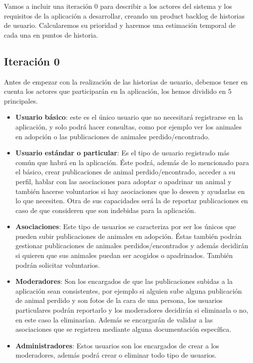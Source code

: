 Vamos a incluir una iteración 0 para describir a los actores del sistema y los requisitos de la aplicación a desarrollar, creando un product backlog de historias de usuario. Calcularemos  su prioridad y haremos una estimación temporal de cada una en puntos de historia.  

\subsection{Iteración 0}
Antes de empezar con la realización de las historias de usuario, debemos tener en cuenta los actores que participarán en la aplicación, los hemos dividido en 5 principales.
\begin{itemize}
	\item \textbf{Usuario básico}: este es el único usuario que no necesitará registrarse en la aplicación, y solo podrá hacer consultas, como por ejemplo ver los animales en adopción o las publicaciones de animales perdido/encontrado.
	\item \textbf{Usuario estándar o particular}: Es el tipo de usuario registrado más común que habrá en la aplicación. Éste podrá, además de lo mencionado para el básico, crear publicaciones de animal perdido/encontrado, acceder a su perfil, hablar con las asociaciones para adoptar o apadrinar un animal y también hacerse voluntarios si hay asociaciones que lo deseen y ayudarlas en lo que necesiten. Otra de sus capacidades será la de reportar publicaciones en caso de que consideren que son indebidas para la aplicación.
	\item \textbf{Asociaciones}: Este tipo de usuarios se caracteriza por ser los únicos que pueden subir publicaciones de animales en adopción. Éstas también podrán gestionar publicaciones de animales perdidos/encontrados y además decidirán si quieren que sus animales puedan ser acogidos o apadrinados. También podrán solicitar voluntarios.
	\item \textbf{Moderadores}: Son los encargados de que las publicaciones subidas a la aplicación sean consistentes, por ejemplo si alguien sube alguna publicación de animal perdido y son fotos de la cara de una persona, los usuarios particulares podrán reportarlo y los moderadores decidirán si eliminarla o no, en este caso la eliminarían. Además se encargarán de validar a las asociaciones que se registren mediante alguna documentación específica.
	\item \textbf{Administradores}: Estos usuarios son los encargados de crear a los moderadores, además podrá crear o eliminar todo tipo de usuarios.
	
\end{itemize}
